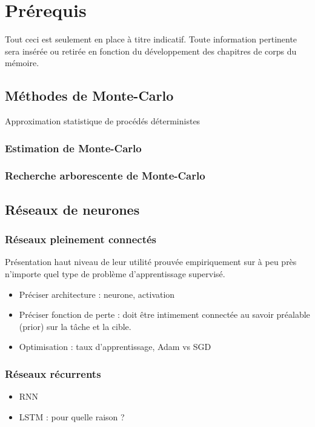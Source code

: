 \chapter{Prérequis}     %
\label{chap:montecarlo}                   %

Tout ceci est seulement en place à titre indicatif.
Toute information pertinente sera insérée ou retirée en fonction
du développement des chapitres de corps du mémoire.

\section{Méthodes de Monte-Carlo}

Approximation statistique de procédés déterministes

\subsection{Estimation de Monte-Carlo}

\subsection{Recherche arborescente de Monte-Carlo}

\section{Réseaux de neurones}

\subsection{Réseaux pleinement connectés}

Présentation haut niveau de leur utilité prouvée empiriquement
sur à peu près n'importe quel type de problème d'apprentissage
supervisé.
\begin{itemize}
    \item Préciser architecture : neurone, activation
    \item Préciser fonction de perte : doit être intimement connectée
          au savoir préalable (prior) sur la tâche et la cible.
    \item Optimisation : taux d'apprentissage, Adam vs SGD
\end{itemize}

\subsection{Réseaux récurrents}

\begin{itemize}
    \item RNN
    \item LSTM : pour quelle raison ?
\end{itemize}